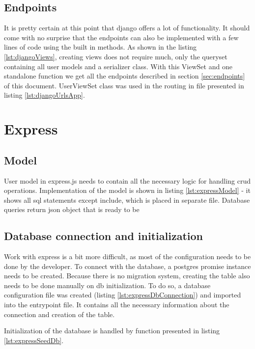 \subsection{Endpoints}
It is pretty certain at this point that django offers a lot of functionality. It should come with no surprise that the endpoints can also be implemented with a few lines of code using the built in methods. As shown in the listing \ref{lst:djangoViews}, creating views does not require much, only the queryset containing all user models and a serializer class.  With this ViewSet and one standalone function we get all the endpoints described in section \ref{sec:endpoints} of this document. UserViewSet class was used in the routing in file presented in listing \ref{lst:djangoUrlsApp}.




%
%
\section{Express}
\subsection{Model}
User model in express.js needs to contain all the necessary logic for handling \acrshort{crud} operations. Implementation of the model is shown in listing \ref{lst:expressModel} - it shows all \acrshort{sql} statements except include, which is placed in separate file. Database queries return \acrshort{json} object that is ready to be


\subsection{Database connection and initialization}
Work with express is a bit more difficult, as most of the configuration needs to be done by the developer. To connect with the database, a postgres promise instance needs to be created. Because there is no migration system, creating the table also needs to be done manually on \acrshort{db} initialization. To do so, a database configuration file was created (listing \ref{lst:expressDbConnection}) and imported into the entrypoint file. It contains all the necessary information about the connection and creation of the table.

Initialization of the database is handled by function presented in listing \ref{lst:expressSeedDb}.


